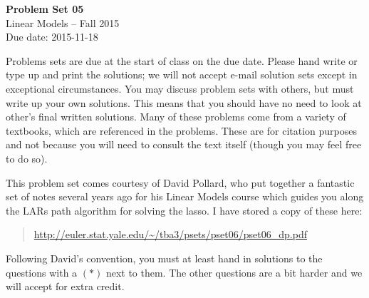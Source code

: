 \documentclass[12pt]{article}
\begin{document}
\begin{center}
{\bf Problem Set 05} \\
Linear Models -- Fall 2015 \\
Due date: 2015-11-18
\end{center}

\medskip

Problems sets are due at the start of class on the due date. Please hand write
or type up and print the solutions; we will not accept e-mail solution sets except
in exceptional circumstances. You may discuss problem sets with others, but must
write up your own solutions. This means that you should have no need to look at other's
final written solutions. Many of these problems come from a variety of textbooks,
which are referenced in the problems. These are for citation purposes and not because
you will need to consult the text itself (though you may feel free to do so).

\medskip

This problem set comes courtesy of David Pollard, who put together a fantastic
set of notes several years ago for his Linear Models course which guides you
along the LARs path algorithm for solving the lasso. I have stored a copy
of these here:
\begin{quote}
\url{http://euler.stat.yale.edu/~/tba3/psets/pset06/pset06_dp.pdf}
\end{quote}
Following David's convention, you must at least hand in solutions to the questions
with a $(*)$ next to them. The other questions are a bit harder and we will accept
for extra credit.
\end{document}

